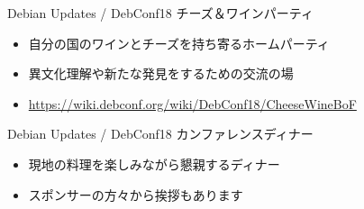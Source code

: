 \documentclass[cjk,dvipdfmx,10pt,compress,%
hyperref={bookmarks=true,bookmarksnumbered=true,bookmarksopen=false,%
colorlinks=false,%
pdftitle={第 132 回 関西 Debian 勉強会},%
pdfauthor={かわだ},%
pdfsubject={資料},%
}]{beamer}
\begin{document}
\begin{frame}{Debian Updates / DebConf18}%
チーズ＆ワインパーティ
\begin{itemize}
  \item 自分の国のワインとチーズを持ち寄るホームパーティ
  \item 異文化理解や新たな発見をするための交流の場
  \item \url{https://wiki.debconf.org/wiki/DebConf18/CheeseWineBoF}
\end{itemize}
\end{frame}

\begin{frame}{Debian Updates / DebConf18}%
カンファレンスディナー
\begin{itemize}
  \item 現地の料理を楽しみながら懇親するディナー
  \item スポンサーの方々から挨拶もあります
\end{itemize}
\end{frame}
\end{document}
